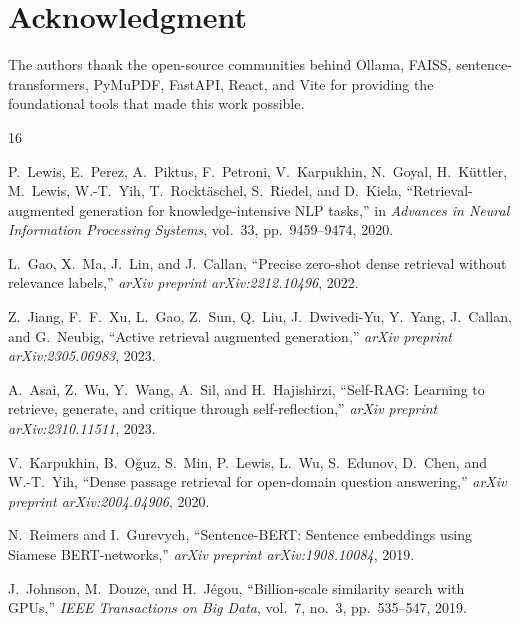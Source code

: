 \documentclass[conference]{IEEEtran}
\begin{document}
\section*{Acknowledgment}

The authors thank the open-source communities behind Ollama, FAISS,
sentence-transformers, PyMuPDF, FastAPI, React, and Vite for providing
the foundational tools that made this work possible.

\begin{thebibliography}{16}

P.~Lewis, E.~Perez, A.~Piktus, F.~Petroni, V.~Karpukhin, N.~Goyal,
H.~K\"{u}ttler, M.~Lewis, W.-T.~Yih, T.~Rockt\"{a}schel, S.~Riedel,
and D.~Kiela,
``Retrieval-augmented generation for knowledge-intensive NLP tasks,''
in \emph{Advances in Neural Information Processing Systems},
vol.~33, pp.~9459--9474, 2020.

L.~Gao, X.~Ma, J.~Lin, and J.~Callan,
``Precise zero-shot dense retrieval without relevance labels,''
\emph{arXiv preprint arXiv:2212.10496}, 2022.

Z.~Jiang, F.~F.~Xu, L.~Gao, Z.~Sun, Q.~Liu, J.~Dwivedi-Yu, Y.~Yang,
J.~Callan, and G.~Neubig,
``Active retrieval augmented generation,''
\emph{arXiv preprint arXiv:2305.06983}, 2023.

A.~Asai, Z.~Wu, Y.~Wang, A.~Sil, and H.~Hajishirzi,
``Self-RAG: Learning to retrieve, generate, and critique through
self-reflection,''
\emph{arXiv preprint arXiv:2310.11511}, 2023.

V.~Karpukhin, B.~O\u{g}uz, S.~Min, P.~Lewis, L.~Wu, S.~Edunov,
D.~Chen, and W.-T.~Yih,
``Dense passage retrieval for open-domain question answering,''
\emph{arXiv preprint arXiv:2004.04906}, 2020.

N.~Reimers and I.~Gurevych,
``Sentence-BERT: Sentence embeddings using Siamese BERT-networks,''
\emph{arXiv preprint arXiv:1908.10084}, 2019.

J.~Johnson, M.~Douze, and H.~J\'{e}gou,
``Billion-scale similarity search with GPUs,''
\emph{IEEE Transactions on Big Data}, vol.~7, no.~3,
pp.~535--547, 2019.


\end{thebibliography}
\end{document}
